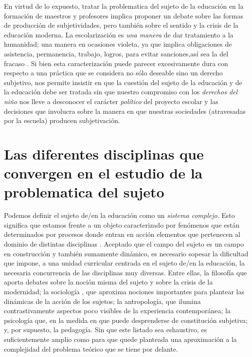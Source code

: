 \documentclass[a4paper,12pt,spanish]{book}
\begin{document}
  En virtud de lo expuesto, tratar la problematica del sujeto de la educación en la formación de maestros y profesores implica proponer un 
  debate sobre las formas de producción de subjetividades, pero también sobre el sentido y la crisis de la educación moderna. La 
  escolarización es \textit{una manera} de dar tratamiento a la humanidad; una manera en ocasiones violeta, ya que implica 
  obligaciones de asistencia, permanencia, trabajo, logros, para evitar sanciones,así sea la del fracaso \citep{baqueroyterigi1996}.
  Si bien esta caracterización puede parecer excesivamente dura con respecto a una práctica que se considera no sólo deseable sino un 
  derecho subjetivo, nos permite insistir en que la cuestión del sujeto de la educación y de la educación debe ser tratada sin que 
  nuestro compromiso con los \textit{derechos del niño} nos lleve a desconocer el carácter \textit{político} del proyecto escolar y 
  las decisiones que involucra sobre la manera en que nuestras sociedades (atravesadas por la escuela) producen subjetivación.

\section{Las diferentes disciplinas que convergen en el estudio de la problematica del sujeto}

Podemos definir el sujeto de/en la educación como un \textit{sistema complejo}. Esto significa que estamos frente a un objeto caracterizado 
por fenómenos que están determinados por procesos donde entran en acción elementos que pertenecen al dominio de distintas
 disciplinas \citep{garcia1986}. Aceptado que el campo del sujeto es un campo en construcción y también sumamente dinámico, es necesario 
 sopesar la dificultad que impone, a una unidad curricular centrada en el sujeto de/en la educación, la necesaria concurrencia de las disciplinas 
 muy diversas. Entre ellas, la filosofía que aporta debates sobre la noción misma del sujeto y sobre la crisis de la modernidad; la sociología 
 , que aproxima nociones importantes para plantear las dinámicas de la acción de los sujetos; la antropología, que ilumina contrastivamente aspectos 
 poco visibles de la experiencia contemporánea; la psicología que, en la medida en que puede desprenderse de constitución subjetiva; y, por supuesto, 
 la pedagogía. Sin que este listado sea eshaustivo, es suficientemente amplio como para que quede planteada una aproximación a la complejidad del 
 problema teórico que se tiene por delante.
\end{document}
